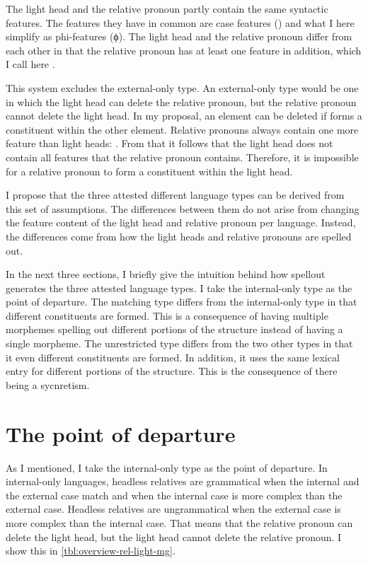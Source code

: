The light head and the relative pronoun partly contain the same syntactic features. The features they have in common are case features () and what I here simplify as phi-features (ϕ). The light head and the relative pronoun differ from each other in that the relative pronoun has at least one feature in addition, which I call here .

This system excludes the external-only type. An external-only type would be one in which the light head can delete the relative pronoun, but the relative pronoun cannot delete the light head. In my proposal, an element can be deleted if forms a constituent within the other element. Relative pronouns always contain one more feature than light heads: . From that it follows that the light head does not contain all features that the relative pronoun contains. Therefore, it is impossible for a relative pronoun to form a constituent within the light head.

I propose that the three attested different language types can be derived from this set of assumptions. The differences between them do not arise from changing the feature content of the light head and relative pronoun per language. Instead, the differences come from how the light heads and relative pronouns are spelled out.

In the next three sections, I briefly give the intuition behind how spellout generates the three attested language types.
I take the internal-only type as the point of departure.
The matching type differs from the internal-only type in that different constituents are formed. This is a consequence of having multiple morphemes spelling out different portions of the structure instead of having a single morpheme.
The unrestricted type differs from the two other types in that it even different constituents are formed. In addition, it uses the same lexical entry for different portions of the structure. This is the consequence of there being a sycnretism.


\section{The point of departure}

As I mentioned, I take the internal-only type as the point of departure.
In internal-only languages, headless relatives are grammatical when the internal and the external case match and when the internal case is more complex than the external case. Headless relatives are ungrammatical when the external case is more complex than the internal case. That means that the relative pronoun can delete the light head, but the light head cannot delete the relative pronoun. I show this in \ref{tbl:overview-rel-light-mg}.


